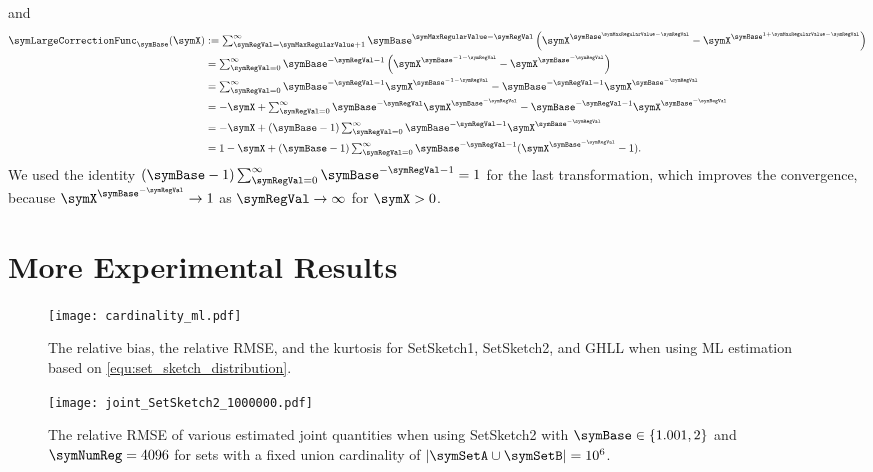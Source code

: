 \documentclass[sigconf, nonacm]{acmart}
\begin{document}
and
\begin{align*}
\symLargeCorrectionFunc_\symBase(\symX)
&:=
\textstyle
\sum_{\symRegVal=\symMaxRegularValue+1}^\infty \symBase^{\symMaxRegularValue-\symRegVal} \left(\symX^{\symBase^{\symMaxRegularValue-\symRegVal}} - \symX^{\symBase^{1 + \symMaxRegularValue-\symRegVal}}\right)
\\
&=
\textstyle
\sum_{\symRegVal=0}^\infty \symBase^{-\symRegVal-1} \left(\symX^{\symBase^{-1-\symRegVal}} - \symX^{\symBase^{-\symRegVal}}\right)
\\
&=
\textstyle
\sum_{\symRegVal=0}^\infty \symBase^{-\symRegVal-1} \symX^{\symBase^{-1-\symRegVal}} - \symBase^{-\symRegVal-1} \symX^{\symBase^{-\symRegVal}}
\\
&=
\textstyle
-\symX+
\sum_{\symRegVal=0}^\infty \symBase^{-\symRegVal} \symX^{\symBase^{-\symRegVal}} - \symBase^{-\symRegVal-1} \symX^{\symBase^{-\symRegVal}}
\\
&=
\textstyle
-\symX+
(\symBase-1)\sum_{\symRegVal=0}^\infty \symBase^{-\symRegVal-1} \symX^{\symBase^{-\symRegVal}}
\\
&=
\textstyle
1-\symX
+
(\symBase-1)
\sum_{\symRegVal=0}^\infty \symBase^{-\symRegVal-1}(\symX^{\symBase^{-\symRegVal}}-1).
\end{align*}
We used the identity $(\symBase-1)\sum_{\symRegVal=0}^\infty \symBase^{-\symRegVal-1} = 1$ for the last transformation, which improves the convergence, because $\symX^{\symBase^{-\symRegVal}}\rightarrow 1$ as $\symRegVal\rightarrow\infty$ for $\symX>0$.

\section{More Experimental Results}

\begin{figure}[H]
  \centering
  \texttt{[image: cardinality\_ml.pdf]}
  \caption{\boldmath The relative bias, the relative \acs*{RMSE}, and the kurtosis for SetSketch1, SetSketch2, and \acs*{GHLL} when using \acs*{ML} estimation based on \eqref{equ:set_sketch_distribution}.}
  \label{fig:cardinality_ml}
\end{figure}

\begin{figure*}[h]
\centering
\texttt{[image: joint\_SetSketch2\_1000000.pdf]}
\caption{\boldmath The relative \acs*{RMSE} of various estimated joint quantities when using SetSketch2 with $\symBase\in\lbrace1.001, 2\rbrace$ and $\symNumReg=4096$ for sets with a fixed union cardinality of $|\symSetA\cup\symSetB|=10^6$.}
\label{fig:joint_set_sketch2_1000000}
\end{figure*}
\end{document}
